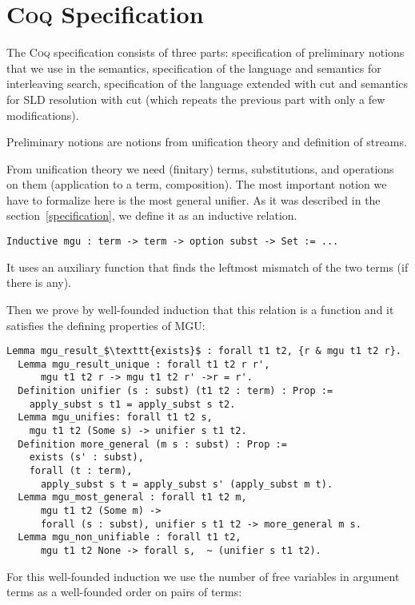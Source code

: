 \section{\textsc{Coq} Specification}
\label{appendix_coq}

The \textsc{Coq} specification consists of three parts: specification of preliminary notions that we use in the semantics, specification of the language and semantics for interleaving search, specification of the language extended with cut and semantics for SLD resolution with cut (which repeats the previous part with only a few modifications).

Preliminary notions are notions from unification theory and definition of streams.

From unification theory we need (finitary) terms, substitutions, and operations on them (application to a term, composition). The most important notion we have to formalize here is the most general unifier. As it was described in the section~\ref{specification}, we define it as an inductive relation.

\begin{lstlisting}[language=Coq]
  Inductive mgu : term -> term -> option subst -> Set := ...
\end{lstlisting}

It uses an auxiliary function that finds the leftmost mismatch of the two terms (if there is any).

Then we prove by well-founded induction that this relation is a function and it satisfies the defining properties of MGU:

\begin{lstlisting}[language=Coq]
  Lemma mgu_result_$\texttt{exists}$ : forall t1 t2, {r & mgu t1 t2 r}.
  Lemma mgu_result_unique : forall t1 t2 r r',
      mgu t1 t2 r -> mgu t1 t2 r' ->r = r'.
  Definition unifier (s : subst) (t1 t2 : term) : Prop :=
    apply_subst s t1 = apply_subst s t2.
  Lemma mgu_unifies: forall t1 t2 s,
    mgu t1 t2 (Some s) -> unifier s t1 t2.
  Definition more_general (m s : subst) : Prop :=
    exists (s' : subst),
    forall (t : term),
      apply_subst s t = apply_subst s' (apply_subst m t).
  Lemma mgu_most_general : forall t1 t2 m,
      mgu t1 t2 (Some m) ->
      forall (s : subst), unifier s t1 t2 -> more_general m s.
  Lemma mgu_non_unifiable : forall t1 t2,
      mgu t1 t2 None -> forall s,  ~ (unifier s t1 t2).
\end{lstlisting}

For this well-founded induction we use the number of free variables in argument terms as a well-founded order on pairs of terms:

